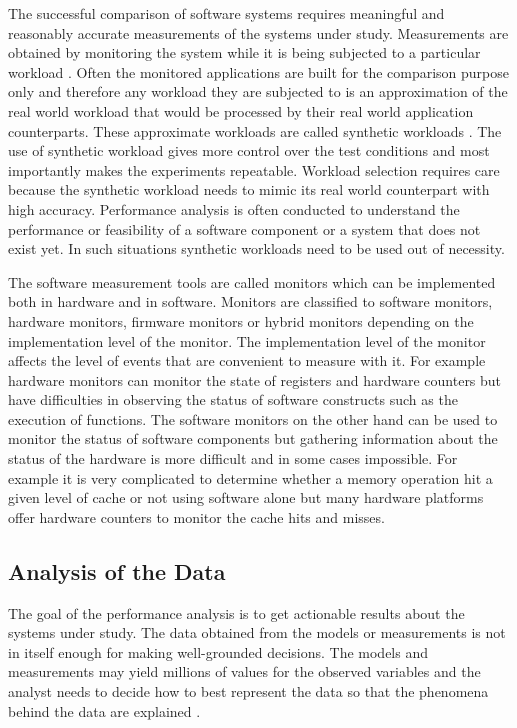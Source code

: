 The successful comparison of software systems requires meaningful and reasonably accurate measurements of the systems under study. Measurements are obtained by monitoring the system while it is being subjected to a particular workload \cite{jain1991art}. Often the monitored applications are built for the comparison purpose only and therefore any workload they are subjected to is an approximation of the real world workload that would be processed by their real world application counterparts. These approximate workloads are called synthetic workloads \cite{jain1991art}. The use of synthetic workload gives more control over the test conditions and most importantly makes the experiments repeatable. Workload selection requires care because the synthetic workload needs to mimic its real world counterpart with high accuracy. Performance analysis is often conducted to understand the performance or feasibility of a software component or a system that does not exist yet. In such situations synthetic workloads need to be used out of necessity.  

The software measurement tools are called monitors which can be implemented both in hardware and in software. Monitors are classified to software monitors, hardware monitors, firmware monitors or hybrid monitors depending on the implementation level of the monitor. The implementation level of the monitor affects the level of events that are convenient to measure with it. For example hardware monitors can monitor the state of registers and hardware counters but have difficulties in observing the status of software constructs such as the execution of functions. The software monitors on the other hand can be used to monitor the status of software components but gathering information about the status of the hardware is more difficult and in some cases impossible. \cite{jain1991art} For example it is very complicated to determine whether a memory operation hit a given level of cache or not using software alone but many hardware platforms offer hardware counters to monitor the cache hits and misses.


\subsection{Analysis of the Data}
\label{subsec:data-analysis}
The goal of the performance analysis is to get actionable results about the systems under study. The data obtained from the models or measurements is not in itself enough for making well-grounded decisions. The models and measurements may yield millions of values for the observed variables and the analyst needs to decide how to best represent the data so that the phenomena behind the data are explained \cite{jain1991art}.

